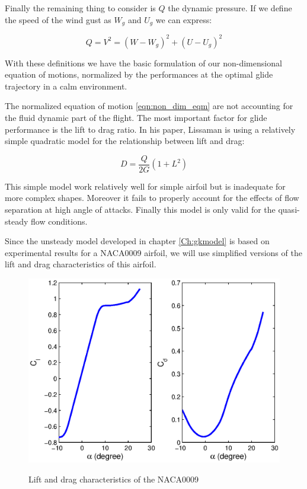 \par Finally the remaining thing to consider is $Q$ the dynamic pressure. If we define the speed of the wind gust as $W_g$ and $U_g$ we can express:

\begin{equation}
Q = V^2 = (W-W_g)^2 + (U-U_g)^2
\label{eqn:q_def}
\end{equation}

\par With these definitions we have the basic formulation of our non-dimensional equation of motions, normalized by the performances at the optimal glide trajectory in a calm environment.

The normalized equation of motion \ref{eqn:non_dim_eqm} are not accounting for the fluid dynamic part of the flight.
The most important factor for glide performance is the lift to drag ratio. 
In his paper, Lissaman \cite{Lissaman2007neutral} is using a relatively simple quadratic model for the relationship between lift and drag:

\begin{equation}
D=\frac{Q}{2G}(1+L^2)
\label{eqn:Lissaman_G}
\end{equation}


\par This simple model work relatively well for simple airfoil but is inadequate for more complex shapes.
Moreover it fails to properly account for the effects of flow separation at high angle of attacks.
Finally this model is only valid for the quasi-steady flow conditions.

\par Since the unsteady model developed in chapter \ref{Ch:gkmodel} is based on experimental results for a NACA0009 airfoil, we will use simplified versions of the lift and drag characteristics of this airfoil.

\begin{figure}[ht]
\begin{center}
  \scalebox{1.0}
  {\includegraphics{./Figures/NACA0009_steady_map_Cl_Cd.eps}} 
\end{center}
\caption{Lift and drag characteristics of the NACA0009}
\end{figure}


